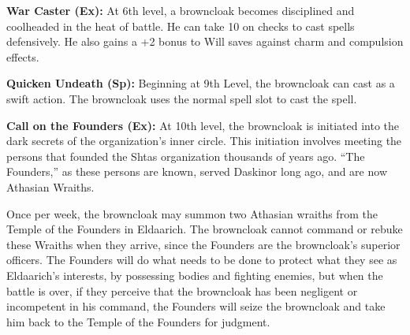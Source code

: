 {\textbf{War Caster (Ex):} At 6th level, a browncloak becomes disciplined and coolheaded in the heat of battle. He can take 10 on  checks to cast spells defensively. He also gains a +2 bonus to Will saves against charm and compulsion effects.

\textbf{Quicken Undeath (Sp):} Beginning at 9th Level, the browncloak can cast  as a swift action. The browncloak uses the normal spell slot to cast the spell.

\textbf{Call on the Founders (Ex):} At 10th level, the browncloak is initiated into the dark secrets of the organization's inner circle. This initiation involves meeting the persons that founded the Shtas organization thousands of years ago. ``The Founders,'' as these persons are known, served Daskinor long ago, and are now Athasian Wraiths.

Once per week, the browncloak may summon two Athasian wraiths from the Temple of the Founders in Eldaarich. The browncloak cannot command or rebuke these Wraiths when they arrive, since the Founders are the browncloak's superior officers. The Founders will do what needs to be done to protect what they see as Eldaarich's interests, by possessing bodies and fighting enemies, but when the battle is over, if they perceive that the browncloak has been negligent or incompetent in his command, the Founders will seize the browncloak and take him back to the Temple of the Founders for judgment.
}
